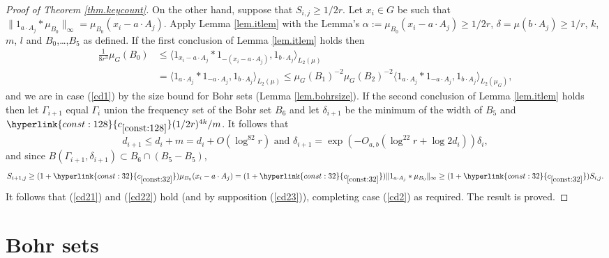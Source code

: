 \documentclass[12pt,reqno]{amsart}
\numberwithin{equation}{section}
\newcommand{\refconstlittle}[1]{%
    \hyperlink{const:#1}{c_{\ref{const:#1}}}%
}
\begin{document}
\begin{proof}[Proof of Theorem \ref{thm.keycount}]
On the other hand, suppose that $S_{i,j} \geq 1/2r$. Let $x_i \in G$ be such that $\|1_{a \cdot A_j} \ast \mu_{B_0}\|_\infty = \mu_{B_0}(x_i-a\cdot A_j)$. Apply Lemma \ref{lem.itlem} with the Lemma's $\alpha:=\mu_{B_0}(x_i-a\cdot A_j)\geq 1/2r$, $\delta = \mu(b\cdot A_j)\geq 1/r$, $k$, $m$, $l$ and $B_0$,\dots,$B_5$ as defined. If the first conclusion of Lemma \ref{lem.itlem} holds then
\begin{align*}
\frac{1}{8r^3}\mu_G(B_0) & \leq \langle 1_{x_i-a\cdot A_j} \ast 1_{-(x_i - a\cdot A_j)},1_{b \cdot A_j}\rangle_{L_2(\mu)}\\ & =  \langle 1_{a\cdot A_j} \ast 1_{- a\cdot A_j},1_{b \cdot A_j}\rangle_{L_2(\mu)} \leq \mu_G(B_1)^{-2}\mu_G(B_2)^{-2}\langle  1_{a\cdot A_j} \ast 1_{- a\cdot A_j},1_{b \cdot A_j}\rangle_{L_2(\mu_G)},
\end{align*}
and we are in case (\ref{cd1}) by the size bound for Bohr sets (Lemma \ref{lem.bohrsize}). If the second conclusion of Lemma \ref{lem.itlem} holds then let $\Gamma_{i+1}$ equal $\Gamma_i$ union the frequency set of the Bohr set $B_6$ and let $\delta_{i+1}$ be the minimum of the width of $B_5$ and $\refconstlittle{128}(1/2r)^{4k}/m$. It follows that
\begin{equation*}
d_{i+1} \leq d_i + m = d_i+O(\log^82r)\text{ and }\delta_{i+1} = \exp(-O_{a,b}(\log^22r + \log 2d_i))\delta_i,
\end{equation*}
 and since $B(\Gamma_{i+1},\delta_{i+1}) \subset B_6 \cap (B_5-B_5)$, 
 \begin{equation*}
 S_{i+1,j}\geq (1+\refconstlittle{32})\mu_{B_0}(x_i-a \cdot A_j)=(1+\refconstlittle{32})\|1_{a \cdot A_j} \ast \mu_{B_0}\|_\infty \geq (1+\refconstlittle{32})S_{i,j}.
 \end{equation*}
It follows that (\ref{cd21}) and (\ref{cd22}) hold (and by supposition (\ref{cd23})), completing case (\ref{cd2}) as required. The result is proved.
\end{proof}

\appendix

\section{Bohr sets}\label{ap.bohr}
\end{document}

